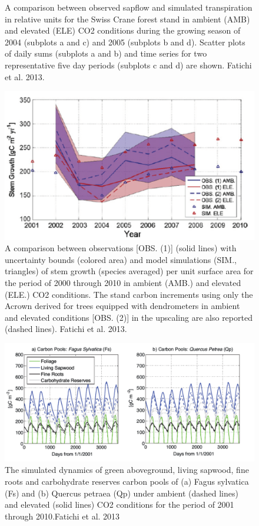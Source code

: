 \documentclass[12pt,oneside]{book}
\begin{document}
\begin{figure}
{}

\caption{A comparison between observed sapflow and simulated transpiration in relative units for the Swiss Crane forest stand in ambient (AMB) and elevated (ELE) CO2 conditions during the growing season of 2004 (subplots a and c) and 2005 (subplots b and d). Scatter plots of daily sums (subplots a and b) and time series for two representative five day periods (subplots c and d) are shown. Fatichi et al. 2013.}\label{fig:f511}
\end{figure}\begin{figure}

{\centering \includegraphics[width=0.8\linewidth]{figures/chap5/f512_fatichi_growth} 

}

\caption{A comparison between observations [OBS. (1)] (solid lines) with uncertainty bounds (colored area) and model simulations (SIM., triangles) of stem growth (species averaged) per unit surface area for the period of 2000 through 2010 in ambient (AMB.) and elevated (ELE.) CO2 conditions. The stand carbon increments using only the Acrown derived for trees equipped with dendrometers in ambient and elevated conditions [OBS. (2)] in the upscaling are also reported (dashed lines). Fatichi et al. 2013.}\label{fig:f512}
\end{figure}

\begin{figure}

{\centering \includegraphics[width=0.8\linewidth]{figures/chap5/f513_fatichi_pools} 

}

\caption{The simulated dynamics of green aboveground, living sapwood, fine roots and carbohydrate reserves carbon pools of (a) Fagus sylvatica (Fs) and (b) Quercus petraea (Qp) under ambient (dashed lines) and elevated (solid lines) CO2 conditions for the period of 2001 through 2010.Fatichi et al. 2013}\label{fig:f513}
\end{figure}
\end{document}
